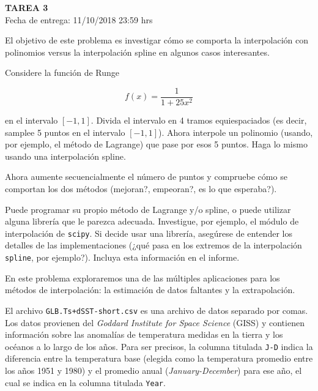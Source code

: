 \documentclass[letter, 11pt]{article}
\newcommand{\tareanro}{3}
\newcommand{\fechaentrega}{11/10/2018 23:59 hrs}
\begin{document}
\thispagestyle{firstpage}

\begin{center}
  {\uppercase{\LARGE \bf Tarea \tareanro}}\\
  Fecha de entrega: \fechaentrega
\end{center}



El objetivo de este problema es investigar cómo se comporta la interpolación
con polinomios versus la interpolación spline en algunos casos interesantes.

Considere la función de Runge

$$ f(x) = \frac{1}{1 + 25 x^2} $$

\noindent en el intervalo $[-1, 1]$. Divida el intervalo en 4 tramos
equiespaciados (es decir, samplee 5 puntos en el intervalo $[-1, 1]$). Ahora
interpole un polinomio (usando, por ejemplo, el método de Lagrange) que pase
por esos 5 puntos. Haga lo mismo usando una interpolación spline.

Ahora aumente secuencialmente el número de puntos y compruebe cómo se comportan
los dos métodos (mejoran?, empeoran?, es lo que esperaba?).

\begin{ayuda}

  Puede programar su propio método de Lagrange y/o spline, o puede utilizar
  alguna librería que le parezca adecuada. Investigue, por ejemplo, el módulo
  de interpolación de \texttt{scipy}. Si decide usar una librería, asegúrese de
  entender los detalles de las implementaciones (¿qué pasa en los extremos de
  la interpolación \texttt{spline}, por ejemplo?). Incluya esta información en
  el informe.
\end{ayuda}

\vspace{1em}

En este problema exploraremos una de las múltiples aplicaciones para los
métodos de interpolación: la estimación de datos faltantes y la extrapolación.

El archivo \texttt{GLB.Ts+dSST-short.csv} es una archivo de datos separado por
comas. Los datos provienen del \emph{Goddard Institute for Space Science}
(GISS) y contienen información sobre las anomalías de temperatura medidas en la
tierra y los océanos a lo largo de los años. Para ser precisos, la columna
titulada \texttt{J-D} indica la diferencia entre la temperatura base (elegida
como la temperatura promedio entre los años 1951 y 1980) y el promedio
anual (\emph{January-December}) para ese año, el cual se indica en la columna
titulada \texttt{Year}.
\end{document}
